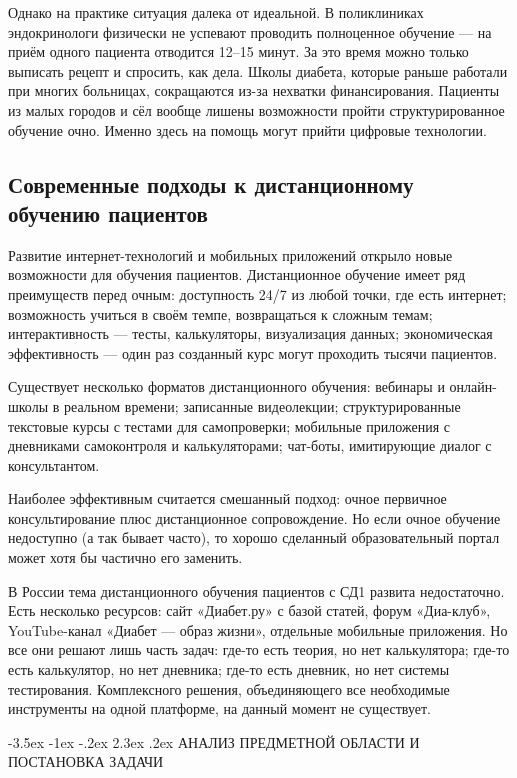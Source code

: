 \documentclass[14pt, a4paper]{extarticle}
\makeatletter
\renewcommand\section{\@startsection {section}{1}{\z@}%
{-3.5ex \@plus -1ex \@minus -.2ex}%
{2.3ex \@plus.2ex}%
{\centering\normalfont\Large\bfseries}}
\makeatother
\begin{document}
\medskip
\noindent Однако на практике ситуация далека от идеальной. В поликлиниках эндокринологи физически не успевают проводить полноценное обучение — на приём одного пациента отводится 12–15 минут. За это время можно только выписать рецепт и спросить, как дела. Школы диабета, которые раньше работали при многих больницах, сокращаются из-за нехватки финансирования. Пациенты из малых городов и сёл вообще лишены возможности пройти структурированное обучение очно. Именно здесь на помощь могут прийти цифровые технологии.
\vskip 7cm
\subsection{Современные подходы к дистанционному обучению пациентов}

\noindent Развитие интернет-технологий и мобильных приложений открыло новые возможности для обучения пациентов. Дистанционное обучение имеет ряд преимуществ перед очным: доступность 24/7 из любой точки, где есть интернет; возможность учиться в своём темпе, возвращаться к сложным темам; интерактивность — тесты, калькуляторы, визуализация данных; экономическая эффективность — один раз созданный курс могут проходить тысячи пациентов.

\noindent Существует несколько форматов дистанционного обучения: вебинары и онлайн-школы в реальном времени; записанные видеолекции; структурированные текстовые курсы с тестами для самопроверки; мобильные приложения с дневниками самоконтроля и калькуляторами; чат-боты, имитирующие диалог с консультантом.

\medskip
\noindent Наиболее эффективным считается смешанный подход: очное первичное консультирование плюс дистанционное сопровождение. Но если очное обучение недоступно (а так бывает часто), то хорошо сделанный образовательный портал может хотя бы частично его заменить.

\medskip
\noindent В России тема дистанционного обучения пациентов с СД1 развита недостаточно. Есть несколько ресурсов: сайт «Диабет.ру» с базой статей, форум «Диа-клуб», YouTube-канал «Диабет — образ жизни», отдельные мобильные приложения. Но все они решают лишь часть задач: где-то есть теория, но нет калькулятора; где-то есть калькулятор, но нет дневника; где-то есть дневник, но нет системы тестирования. Комплексного решения, объединяющего все необходимые инструменты на одной платформе, на данный момент не существует.

\newpage
\section{АНАЛИЗ ПРЕДМЕТНОЙ ОБЛАСТИ И ПОСТАНОВКА ЗАДАЧИ}
\end{document}
